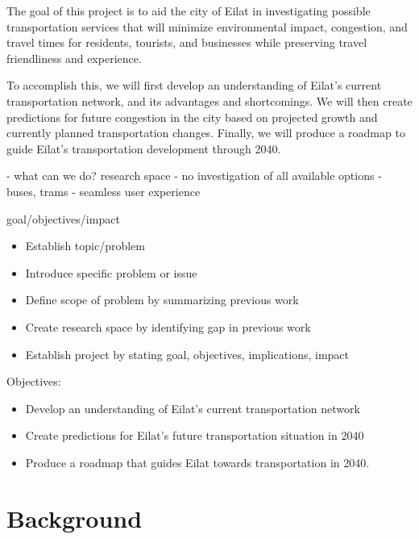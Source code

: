 \documentclass[12pt]{article}                         %
\begin{document}
The goal of this project is to aid the city of Eilat in investigating possible transportation services that will minimize environmental impact, congestion, and travel times for residents, tourists, and businesses while preserving travel friendliness and experience.

To accomplish this, we will first develop an understanding of Eilat's current transportation network, and its advantages and shortcomings. We will then create predictions for future congestion in the city based on projected growth and currently planned transportation changes. Finally, we will produce a roadmap to guide Eilat's transportation development through 2040.



 
 - what can we do? research space 
	 - no  investigation of all available options - buses, trams
     - seamless user experience

goal/objectives/impact

\begin{itemize}
    \item Establish topic/problem
    \item Introduce specific problem or issue
    \item Define scope of problem by summarizing previous work
    \item Create research space by identifying gap in previous work
    \item Establish project by stating goal, objectives, implications, impact
\end{itemize}


Objectives:
\begin{itemize}
    \item Develop an understanding of Eilat's current transportation network
    
    \item Create predictions for Eilat's future transportation situation in 2040
    
    \item Produce a roadmap that guides Eilat towards transportation in 2040.
\end{itemize}

\newpage
\section{Background}
\end{document}

